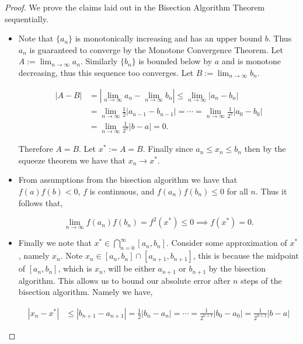 \documentclass[10pt]{article}
\begin{document}
\begin{proof}
    We prove the claims laid out in the Bisection Algorithm Theorem sequentially.
    \begin{itemize}
        \item Note that $\{a_n\}$ is monotonically increasing and has an upper bound $b$. Thus $a_{n}$ is guaranteed to converge by the Monotone Convergence Theorem. Let $A:=\lim_{n\to\infty}a_{n}$. Similarly $\{b_{n}\}$ is bounded below by $a$ and is monotone decreasing, thus this sequence too converges. Let $B:=\lim_{n\to\infty}b_{n}$.

        \begin{align*}
            |A-B| &= |\lim_{n\to \infty}a_{n} -\lim_{n\to \infty}b_{n} | \leq \lim_{n\to\infty}|a_n  - b_n| \\
            &= \lim_{n\to\infty}\frac{1}{2}|a_{n-1}-b_{n-1}| = \cdots =\lim_{n\to\infty}\frac{1}{2^{2}}|a_{0}-b_{0}| \\
            &= \lim_{n\to\infty}\frac{1}{2^{n}}|b-a| = 0.
        \end{align*}

        Therefore $A=B$. Let $x^* := A=B$. Finally since $a_{n}\leq x_{n}\leq b_{n}$ then by the squeeze theorem we have that $x_{n}\to x^*$.

        \item From assumptions from the bisection algorithm we have that $f(a)f(b)<0$, $f$ is continuous, and $f(a_{n})f(b_n)\leq 0$ for all $n$. Thus it follows that,

        \[
        \lim_{n\to\infty}f(a_n)f(b_n) = f^{2}(x^*) \leq 0 \implies f(x^{*}) = 0.
        \]

        \item Finally we note that $x^*\in \bigcap_{n=0}^{\infty}[a_{n}, b_{n}]$. Consider some approximation of $x^*$, namely $x_{n}$. Note $x_{n}\in [a_{n}, b_{n}]\cap [a_{n+1}, b_{n+1}]$, this is because the midpoint of $[a_n, b_n]$, which is $x_n$, will be either $a_{n+1}$ or $b_{n+1}$ by the bisection algorithm. This allows us to bound our absolute error after $n$ steps of the bisection algorithm. Namely we have,

        \begin{align*}
            |x_{n}-x^*| &\leq |b_{n+1}-a_{n+1}| = \frac{1}{2}|b_{n}-a_{n}|=\cdots =\frac{1}{2^{n+1}}|b_{0}-a_0 | = \frac{1}{2^{n+1}}|b-a|
        \end{align*}
    \end{itemize}
\end{proof}
\end{document}
